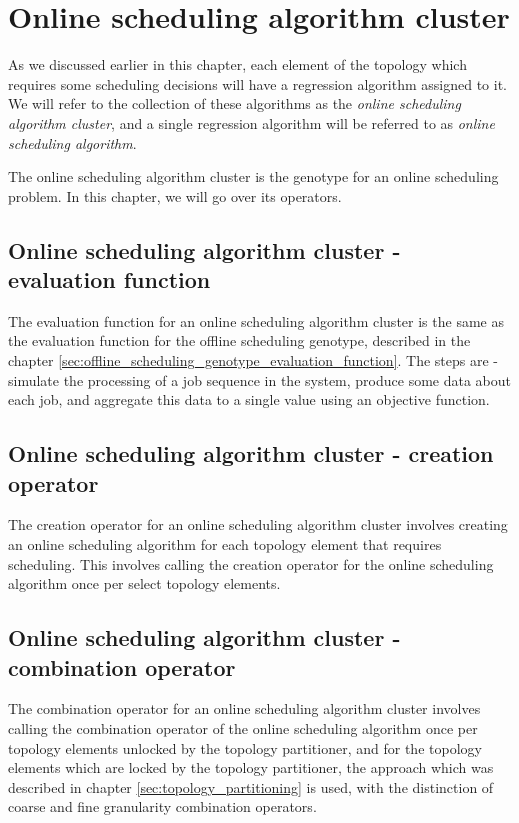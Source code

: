 \section{Online scheduling algorithm cluster}
\label{sec:online_scheduling_algorithm_cluster}

As we discussed earlier in this chapter, each element of the topology which requires some scheduling decisions will have a regression algorithm assigned to it. We will refer to the collection of these algorithms as the \textit{online scheduling algorithm cluster}, and a single regression algorithm will be referred to as \textit{online scheduling algorithm}.

The online scheduling algorithm cluster is the genotype for an online scheduling problem. In this chapter, we will go over its operators.

\subsection{Online scheduling algorithm cluster - evaluation function}
The evaluation function for an online scheduling algorithm cluster is the same as the evaluation function for the offline scheduling genotype, described in the chapter \ref{sec:offline_scheduling_genotype_evaluation_function}. The steps are - simulate the processing of a job sequence in the system, produce some data about each job, and aggregate this data to a single value using an objective function.

\subsection{Online scheduling algorithm cluster - creation operator}
The creation operator for an online scheduling algorithm cluster involves creating an online scheduling algorithm for each topology element that requires scheduling. This involves calling the creation operator for the online scheduling algorithm once per select topology elements.

\subsection{Online scheduling algorithm cluster - combination operator}
The combination operator for an online scheduling algorithm cluster involves calling the combination operator of the online scheduling algorithm once per topology elements unlocked by the topology partitioner, and for the topology elements which are locked by the topology partitioner, the approach which was described in chapter \ref{sec:topology_partitioning} is used, with the distinction of coarse and fine granularity combination operators.

